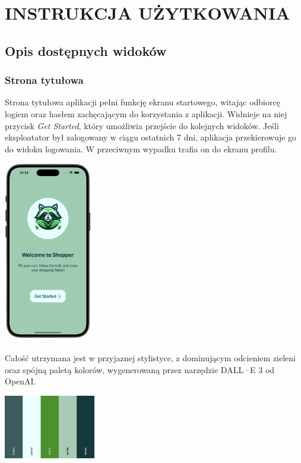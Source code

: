\chapter{INSTRUKCJA UŻYTKOWANIA}
\label{chapter:instrukcja_uzytkowania}

\section{Opis dostępnych widoków}

\subsection{Strona tytułowa}


Strona tytułowa aplikacji pełni funkcję ekranu startowego, witając odbiorcę logiem oraz hasłem zachęcającym do korzystania z aplikacji. Widnieje na niej przycisk \textit{Get Started}, który umożliwia przejście do kolejnych widoków. Jeśli eksploatator był zalogowany w ciągu ostatnich 7 dni, aplikacja przekierowuje go do widoku logowania. W przeciwnym wypadku trafia on do ekranu profilu. 

\begin{center} \includegraphics[width=0.3\textwidth]{images/front/home_page.png} \end{center}

Całość utrzymana jest w przyjaznej stylistyce, z dominującym odcieniem zieleni oraz spójną paletą kolorów, wygenerowaną przez narzędzie DALL·E 3 od OpenAI.

\begin{center} \includegraphics[width=0.3\textwidth]{images/front/theme.png} \end{center}

